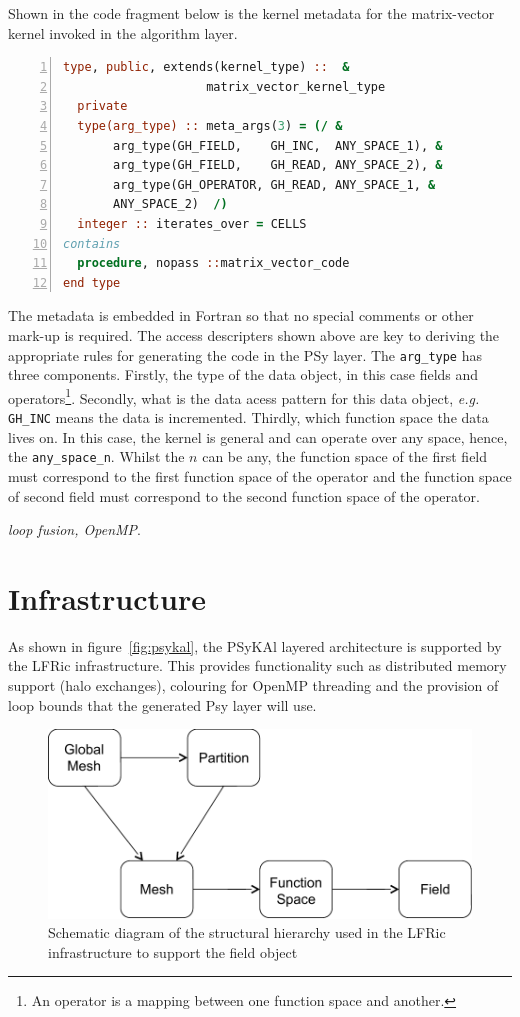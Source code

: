 \documentclass[times]{elsarticle}
\begin{document}
Shown in the code fragment below is the kernel metadata for the
matrix-vector kernel invoked in the algorithm layer.
\begin{lstlisting}[language=Fortran, numbers=left]
type, public, extends(kernel_type) ::  &
                    matrix_vector_kernel_type
  private
  type(arg_type) :: meta_args(3) = (/ &
       arg_type(GH_FIELD,    GH_INC,  ANY_SPACE_1), &
       arg_type(GH_FIELD,    GH_READ, ANY_SPACE_2), &
       arg_type(GH_OPERATOR, GH_READ, ANY_SPACE_1, &
       ANY_SPACE_2)  /)
  integer :: iterates_over = CELLS
contains
  procedure, nopass ::matrix_vector_code
end type
\end{lstlisting}
The metadata is embedded in Fortran so that no special comments or
other mark-up is required. The access descripters shown above are key
to deriving the appropriate rules for generating the code in the PSy
layer. The \verb+arg_type+ has three components. Firstly, the type of
the data object, in this case fields and operators\footnote{An
  operator is a mapping between one function space and another.}. Secondly, what is
the data acess pattern for this data object, {\em e.g.} \verb+GH_INC+ means the data is
incremented. Thirdly, which function space the data lives on. In this case, the
kernel is general and can operate over any space, hence, the
\verb+any_space_n+. Whilst the $n$ can be any, the function space of the
first field must correspond to the first function space of the operator and the
function space of second field must correspond to the second function
space of the operator. 

{\em loop fusion, OpenMP}. 

\section{\label{sec:lib}Infrastructure}

As shown in figure~\ref{fig:psykal}, the PSyKAl layered
architecture is supported by the LFRic infrastructure. This provides
functionality such as distributed memory support (halo exchanges),
colouring for OpenMP threading and the provision of loop bounds that the
generated Psy layer will use.

\begin{figure}
\centering\includegraphics[width=0.8\linewidth]{infrastructure_objects.pdf}
\caption{\label{fig:objects} Schematic diagram of the structural
hierarchy used in the LFRic infrastructure to support the field object}
\end{figure}
\end{document}
